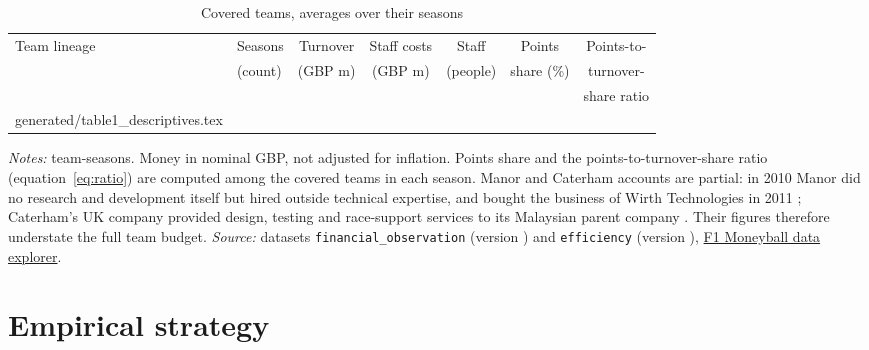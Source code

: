 \documentclass[11pt,a4paper]{article}
\newcommand{\site}{https://nahianibnat-2000.github.io/F1-moneyball}
\newcommand{\sitepage}[2]{\href{\site/#1}{#2}}
\begin{document}
\begin{table}[htbp]
\centering
\begin{threeparttable}
\caption{Covered teams, averages over their seasons}
\label{tab:desc}
\small
\begin{tabular}{@{}>{\raggedright\arraybackslash}p{4.2cm}lrrrrr@{}}
\toprule
Team lineage & Seasons & \multicolumn{1}{c}{Turnover} & \multicolumn{1}{c}{Staff costs} & \multicolumn{1}{c}{Staff} & \multicolumn{1}{c}{Points} & \multicolumn{1}{c}{Points-to-} \\
 & (count) & \multicolumn{1}{c}{(GBP m)} & \multicolumn{1}{c}{(GBP m)} & \multicolumn{1}{c}{(people)} & \multicolumn{1}{c}{share (\%)} & \multicolumn{1}{c}{turnover-} \\
 & & & & & & \multicolumn{1}{c}{share ratio} \\
\midrule
{} generated/table1_descriptives.tex 
\bottomrule
\end{tabular}
\begin{tablenotes}[flushleft]\footnotesize
\item \textit{Notes:} \NTeamSeasons{} team-seasons. Money in nominal GBP, not adjusted for inflation. Points share and the
points-to-turnover-share ratio (equation~\ref{eq:ratio}) are computed among the covered teams in each season. Manor and Caterham accounts are partial: in 2010 Manor did no research and
development itself but hired outside technical expertise, and bought the business of Wirth Technologies in 2011
\citep{ch_manor}; Caterham's UK company provided design, testing and race-support services to its Malaysian parent company
\citep{ch_caterham}. Their figures therefore understate the full team budget. \textit{Source:} datasets \texttt{financial\_observation} (version \VerFinancialObservation)
and \texttt{efficiency} (version \VerEfficiency), \sitepage{data}{F1 Moneyball data explorer}.
\end{tablenotes}
\end{threeparttable}
\end{table}

\section{Empirical strategy}
\label{sec:strategy}
\end{document}
